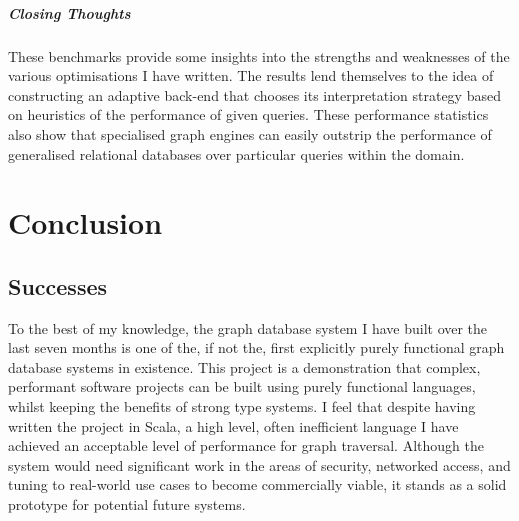 \documentclass[12pt,a4paper,twoside,openright]{report}
\let\oldparagraph\paragraph
\renewcommand{\paragraph}[1]{\oldparagraph{#1}\mbox{}}
\begin{document}
			\paragraph{Closing Thoughts}
			These benchmarks provide some insights into the strengths and weaknesses of the various optimisations I have written. The results lend themselves to the idea of constructing an adaptive back-end that chooses its interpretation strategy based on heuristics of the performance of given queries. These performance statistics also show that specialised graph engines can easily outstrip the performance of generalised relational databases over particular queries within the domain.


	
\chapter{Conclusion}

\section{Successes}
To the best of my knowledge, the graph database system I have built over the last seven months is one of the, if not the, first explicitly purely functional graph database systems in existence. This project is a demonstration that complex, performant software projects can be built using purely functional languages, whilst keeping the benefits of strong type systems. I feel that despite having written the project in Scala, a high level, often inefficient language I have achieved an acceptable level of performance for graph traversal. Although the system would need significant work in the areas of security, networked access, and tuning to real-world use cases to become commercially viable, it stands as a solid prototype for potential future systems.
\end{document}
